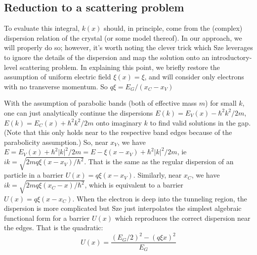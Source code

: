 \subsection{Reduction to a scattering problem}
To evaluate this integral, $k(x)$ should, in principle, come from the (complex) dispersion relation of the crystal (or some model thereof).  In our approach, we will properly do so; however, it's worth noting the clever trick which Sze leverages to ignore the details of the dispersion and map the solution onto an introductory-level scattering problem.  In explaining this point, we briefly restore the assumption of uniform electric field $\xi(x)=\xi$, and will consider only electrons with no transverse momentum.  So $q\xi=E_G/(x_C-x_V)$

With the assumption of parabolic bands (both of effective mass $m$) for small $k$, one can just analytically continue the dispersions $E(k)=E_V(x)-\hbar^2k^2/2m$, $E(k)=E_C(x)+\hbar^2k^2/2m$ onto imaginary $k$ to find valid solutions in the gap.  (Note that this only holds near to the respective band edges because of the parabolicity assumption.)  So, near $x_V$, we have $E=E_V(x)+\hbar^2|k|^2/2m=E-\xi(x-x_V)+\hbar^2|k|^2/2m$, ie $ik=\sqrt{2mq\xi(x-x_V)/\hbar^2}$.  That is the same as the regular dispersion of an particle in a barrier $U(x)=q\xi(x-x_V)$.  Similarly, near $x_C$, we have $ik=\sqrt{2mq\xi(x_C-x)/\hbar^2}$, which is equivalent to a barrier $U(x)=q\xi(x-x_C)$.  When the electron is deep into the tunneling region, the dispersion is more complicated but Sze just interpolates the simplest algebraic functional form for a barrier $U(x)$ which reproduces the correct dispersion near the edges.  That is the quadratic:
$$U(x)=\frac{(E_G/2)^2-(q\xi x)^2}{E_G}$$